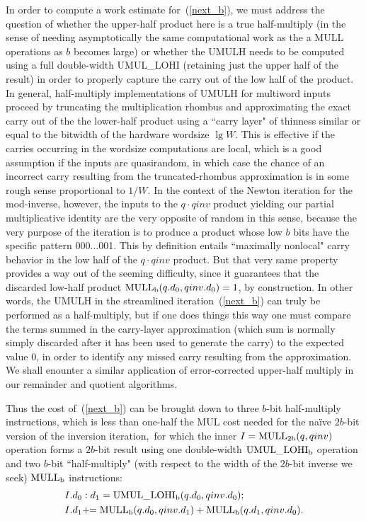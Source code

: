 \documentclass{article}
\begin{document}
In order to compute a work estimate for~(\ref{next_b}), we must address the question of whether the upper-half product here is a true half-multiply (in the sense of needing asymptotically the same computational work as the a MULL operations as $b$ becomes large) or whether the UMULH needs to be computed using a full double-width UMUL\_LOHI (retaining just the upper half of the result) in order to properly capture the carry out of the low half of the product. In general, half-multiply implementations of UMULH for multiword inputs proceed by truncating the multiplication rhombus and approximating the exact carry out of the the lower-half product using a ``carry layer" of thinness similar or equal to the bitwidth of the hardware wordsize $\lg W$. This is effective if the carries occurring in the wordsize computations are local, which is a good assumption if the inputs are quasirandom, in which case the chance of an incorrect carry resulting from the truncated-rhombus approximation is in some rough sense proportional to $1/W$. In the context of the Newton iteration for the mod-inverse, however, the inputs to the $q \cdot qinv$ product yielding our partial multiplicative identity are the very opposite of random in this sense, because the very purpose of the iteration is to produce a product whose low $b$ bits have the specific pattern 000...001. This by definition entails ``maximally nonlocal" carry behavior in the low half of the $q \cdot qinv$ product. But that very same property provides a way out of the seeming difficulty, since it guarantees that the discarded low-half product ${\rm MULL_b}(q.d_0, qinv.d_0) = 1$, by construction. In other words, the UMULH in the streamlined iteration~(\ref{next_b}) can truly be performed as a half-multiply, but if one does things this way one must compare the terms summed in the carry-layer approximation (which sum is normally simply discarded after it has been used to generate the carry) to the expected value 0, in order to identify any missed carry resulting from the approximation. We shall enounter a similar application of error-corrected upper-half multiply in our remainder and quotient algorithms.

Thus the cost of~(\ref{next_b}) can be brought down to three $b$-bit half-multiply instructions, which is less than one-half the MUL cost needed for the na\"ive $2b$-bit version of the inversion iteration,\ for which the inner $I = {\rm MULL_{2b}}(q,qinv)$ operation forms a $2b$-bit result using one double-width ${\rm UMUL\_LOHI_b}$ operation and two $b$-bit ``half-multiply" (with respect to the width of the $2b$-bit inverse we seek) ${\rm MULL_b}$ instructions:
\begin{align}
\nonumber	&I.d_0:d_1 = {\rm UMUL\_LOHI_b}(q.d_0, qinv.d_0) ;\\
\nonumber	&I.d_1 +\!\!= {\rm MULL_b}(q.d_0, qinv.d_1) + {\rm MULL_b}(q.d_1, qinv.d_0) .
\end{align}
\end{document}
